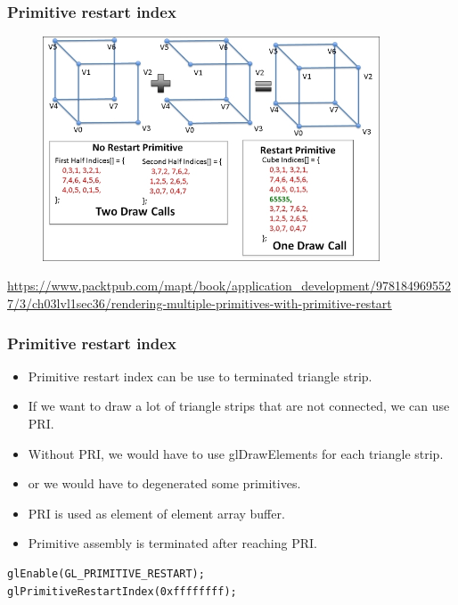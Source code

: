 
\begin{frame}[fragile]
\frametitle{Primitive restart index}
	\begin{figure}[h]
	\includegraphics[width=10cm,keepaspectratio]{pics/pri.jpg}
	\end{figure}
\url{https://www.packtpub.com/mapt/book/application_development/9781849695527/3/ch03lvl1sec36/rendering-multiple-primitives-with-primitive-restart}
\end{frame}


\begin{frame}[fragile]
\frametitle{Primitive restart index}
	\begin{itemize}
    \item Primitive restart index can be use to terminated triangle strip.
    \item If we want to draw a lot of triangle strips that are not connected, we can use PRI.
    \item Without PRI, we would have to use glDrawElements for each triangle strip.
    \item or we would have to degenerated some primitives.
    \item PRI is used as element of element array buffer.
    \item Primitive assembly is terminated after reaching PRI.
	\end{itemize}
\begin{verbatim}
glEnable(GL_PRIMITIVE_RESTART);
glPrimitiveRestartIndex(0xffffffff);
\end{verbatim}
\end{frame}


